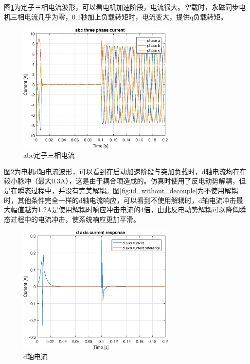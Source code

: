 图\ref{fig:iabc}为定子三相电流波形，可以看电机加速阶段，电流很大。空载时，永磁同步电机三相电流几乎为零，0.1秒加上负载转矩时，电流变大，提供q负载转矩。
\begin{figure}[H]
	\centering
	\includegraphics[width=0.7\textwidth]{figs/iabc.eps}
	\caption{abc定子三相电流}
	\label{fig:iabc}
\end{figure}
图\ref{fig:id}为电机d轴电流波形，可以看到在启动加速阶段与突加负载时，d轴电流均存在较小脉冲（最大0.3A），这是由于耦合项造成的。仿真时使用了反电动势解耦，但是在瞬态过程中，并没有完美解耦。图\ref{fig:id_without_decouple}为不使用解耦时，其他条件完全一样的d轴电流响应，可以看到不使用解耦时，d轴电流冲击最大幅值越为1.2A是使用解耦时响应冲击电流的4倍，由此反电动势解耦可以降低瞬态过程中的电流冲击，使系统响应更加平滑。
\begin{figure}[H]
	\centering
	\includegraphics[width=0.7\textwidth]{figs/id.eps}
	\caption{d轴电流}
	\label{fig:id}
\end{figure}
